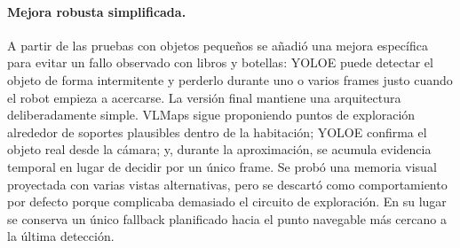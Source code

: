 \documentclass[11pt,fleqn,openany]{book} %
\begin{document}
\paragraph{Mejora robusta simplificada.} A partir de las pruebas con objetos pequeños se añadió una mejora específica para evitar un fallo observado con libros y botellas: YOLOE puede detectar el objeto de forma intermitente y perderlo durante uno o varios frames justo cuando el robot empieza a acercarse. La versión final mantiene una arquitectura deliberadamente simple. VLMaps sigue proponiendo puntos de exploración alrededor de soportes plausibles dentro de la habitación; YOLOE confirma el objeto real desde la cámara; y, durante la aproximación, se acumula evidencia temporal en lugar de decidir por un único frame. Se probó una memoria visual proyectada con varias vistas alternativas, pero se descartó como comportamiento por defecto porque complicaba demasiado el circuito de exploración. En su lugar se conserva un único fallback planificado hacia el punto navegable más cercano a la última detección.
\end{document}
